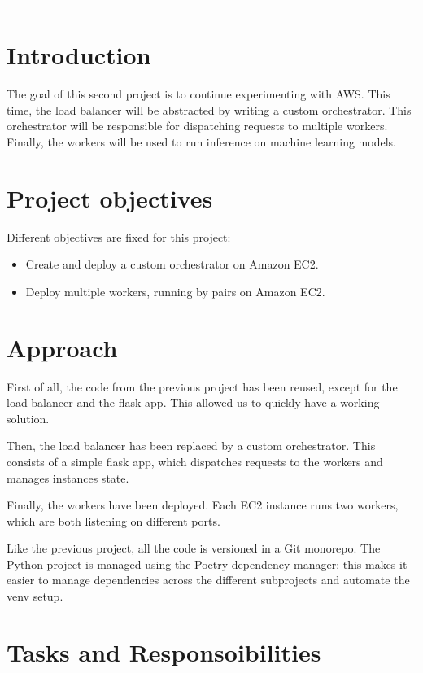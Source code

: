 \documentclass[letterpaper,headings=standardclasses,parskip=half]{scrartcl}
\begin{document}
\noindent\rule{\textwidth}{0.3pt}

\section{Introduction}

The goal of this second project is to continue experimenting with AWS.
This time, the load balancer will be abstracted by writing a custom orchestrator.
This orchestrator will be responsible for dispatching requests to multiple workers.
Finally, the workers will be used to run inference on machine learning models.

\section{Project objectives}

Different objectives are fixed for this project:
\begin{itemize}
    \item Create and deploy a custom orchestrator on Amazon EC2.
    \item Deploy multiple workers, running by pairs on Amazon EC2.
\end{itemize}

\section{Approach}

First of all, the code from the previous project has been reused, except for the load balancer and the flask app.
This allowed us to quickly have a working solution.

Then, the load balancer has been replaced by a custom orchestrator. This consists of a simple flask app, which dispatches requests to the workers and manages instances state.

Finally, the workers have been deployed. Each EC2 instance runs two workers, which are both listening on different ports.

Like the previous project, all the code is versioned in a Git monorepo. The Python project is managed using the Poetry dependency manager: this makes it easier to manage dependencies across the different subprojects and automate the venv setup.

\section{Tasks and Responsoibilities}
\end{document}
